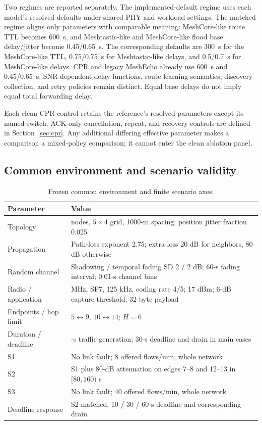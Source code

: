 Two regimes are reported separately. The implemented-default regime
uses each model's resolved defaults under shared PHY and workload settings.
The matched regime aligns only parameters with comparable meaning:
MeshCore-like route TTL becomes 600~s, and Meshtastic-like and MeshCore-like
flood base delay/jitter become 0.45/0.65~s. The corresponding defaults are
300~s for the MeshCore-like TTL, 0.75/0.75~s for Meshtastic-like delays,
and 0.5/0.7~s for MeshCore-like delays. CPR and legacy MeshEcho already
use 600~s and 0.45/0.65~s. SNR-dependent delay functions, route-learning
semantics, discovery collection, and retry policies remain distinct.
Equal base delays do not imply equal total forwarding delay.

Each clean CPR control retains the reference's resolved parameters except
its named switch. ACK-only cancellation, repeat, and recovery controls are
defined in Section~\ref{sec:cpr}. Any additional differing effective
parameter makes a comparison a mixed-policy comparison; it cannot enter
the clean ablation panel.

\subsection{Common environment and scenario validity}

\begin{table}[t]
\caption{Frozen common environment and finite scenario axes.}
\label{tab:settings}
\centering\small
\setlength{\tabcolsep}{3pt}
\begin{tabular}{@{}>{\raggedright\arraybackslash}p{}>{\raggedright\arraybackslash}p{}@{}}
\toprule
Parameter & Value \\
\midrule
Topology & 20 nodes, $5\times4$ grid, 1000-m spacing; position jitter fraction 0.025 \\
Propagation & Path-loss exponent 2.75; extra loss 20 dB for neighbors, 80 dB otherwise \\
Random channel & Shadowing / temporal fading SD 2 / 2 dB; 60-s fading interval; 0.01-s channel bins \\
Radio / application & 915 MHz, SF7, 125 kHz, coding rate 4/5; 17 dBm; 6-dB capture threshold; 32-byte payload \\
Endpoints / hop limit & $5\leftrightarrow9$, $10\leftrightarrow14$; $H=6$ \\
Duration / deadline & 240-s traffic generation; 30-s deadline and drain in main cases \\
S1 & No link fault; 8 offered flows/min, whole network \\
S2 & S1 plus 80-dB attenuation on edges 7--8 and 12--13 in $[80,160)$ s \\
S3 & No link fault; 40 offered flows/min, whole network \\
Deadline response & S2 matched, 10 / 30 / 60-s deadline and corresponding drain \\
\bottomrule
\end{tabular}
\end{table}

